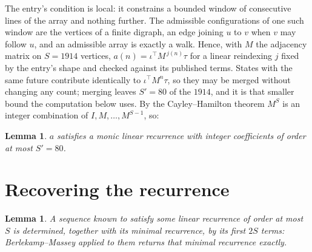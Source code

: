 \documentclass[11pt,a4paper]{article}
\theoremstyle{plain}
\newtheorem{lemma}[theorem]{Lemma}
\theoremstyle{definition}
\begin{document}
The entry's condition is local: it constrains a bounded window of consecutive lines of the
array and nothing further. The admissible configurations of one such window are the vertices
of a finite digraph, an edge joining $u$ to $v$ when $v$ may follow $u$, and an admissible
array is exactly a walk. Hence, with $M$ the adjacency matrix on $S=1914$ vertices,
$a(n)=\iota^{\!\top}M^{\,j(n)}\tau$ for a linear reindexing $j$ fixed by the entry's shape
and checked against its published terms. States with the same future contribute identically to $\iota^{\!\top}M^n\tau$, so they may be merged without changing any count; merging leaves $S'=80$ of the $1914$, and it is that smaller bound the computation below uses. By the Cayley--Hamilton theorem $M^{S}$ is an
integer combination of $I,M,\dots,M^{S-1}$, so:

\begin{lemma}\label{lem:cf}
$a$ satisfies a monic linear recurrence with integer coefficients of order at most
$S'=80$.
\end{lemma}

\section{Recovering the recurrence}

\begin{lemma}\label{lem:bm}
A sequence known to satisfy some linear recurrence of order at most $S$ is determined, together
with its minimal recurrence, by its first $2S$ terms: Berlekamp--Massey applied to them returns
that minimal recurrence exactly.
\end{lemma}
\end{document}

